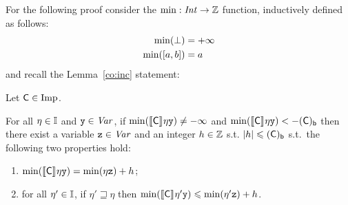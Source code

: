 \noindent
For the following proof consider the \(\min : \Int \to \z\) function,
inductively defined as follows:
\begin{align*}
  \min(\bot) & = + \infty \\
  \min(\interval{a}{b}) & = a
\end{align*}
and recall the Lemma~\ref{co:inc} statement:

\medskip

\noindent
\begin{lemma}\label{co:inc2}
  
  Let \(\com \in \imp\).

  \noindent
  For all \(\eta \in \inte\) and \(\var[y] \in \Var\), if
  \(\min(\semi{\com}\eta\var[y]) \neq -\infty\) and
  \(\min(\semi{\com}\eta\var[y]) < -\lbound{\com}\) then there exist a
  variable \(\var[z] \in\Var\) and an integer \(h \in \z\) s.t.
  \(|h| \leq \lbound{\com}\) s.t.\ the following two properties hold:

  \begin{enumerate}[label=(\roman*)]
  \item\label{point1min}
    \(\min(\semi{\com}\eta \var[y]) = \min(\eta \var[z]) + h\);
  \item\label{point2min} for all \(\eta' \in \inte\), if \(\eta' \sqsupseteq \eta\)
    then
    \(\min(\semi{\com}\eta' \var[y]) \leq \min(\eta' \var[z]) + h\).
  \end{enumerate}
\end{lemma}

